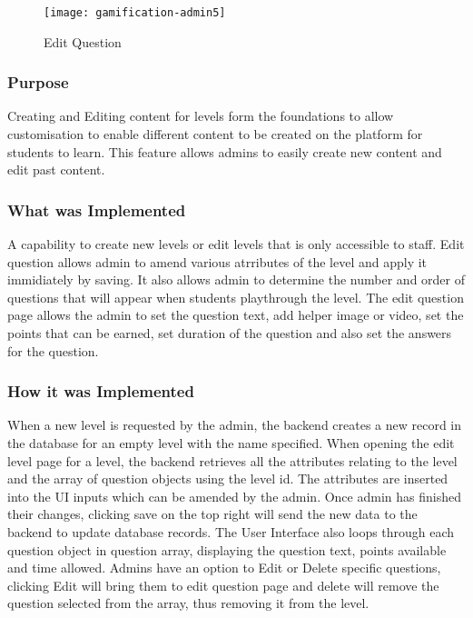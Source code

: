 \begin{figure}[h!]
    \texttt{[image: gamification-admin5]}
    \centering
    \caption{Edit Question}
\end{figure}

\newpage

\subsubsection{Purpose}
Creating and Editing content for levels form the foundations to allow customisation to enable different content to be created on the platform for students to learn. This feature allows admins to easily create new content and edit past content.

\subsubsection{What was Implemented}
A capability to create new levels or edit levels that is only accessible to staff. Edit question allows admin to amend various atrributes of the level and apply it immidiately by saving. It also allows admin to determine the number and order of questions that will appear when students playthrough the level. The edit question page allows the admin to set the question text, add helper image or video, set the points that can be earned,  set duration of the question and also set the answers for the question.

\subsubsection{How it was Implemented}
When a new level is requested by the admin, the backend creates a new record in the database for an empty level with the name specified. When opening the edit level page for a level, the backend retrieves all the attributes relating to the level and the array of question objects using the level id. The attributes are inserted into the UI inputs which can be amended by the admin. Once admin has finished their changes, clicking save on the top right will send the new data to the backend to update database records. The User Interface also loops through each question object in question array, displaying the question text, points available and time allowed. Admins have an option to Edit or Delete specific questions, clicking Edit will bring them to edit question page and delete will remove the question selected from the array, thus removing it from the level.


